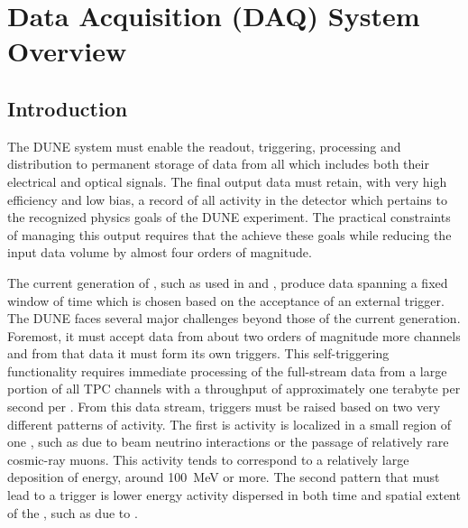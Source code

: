 \section{Data Acquisition (DAQ) System Overview}
\label{sec:fd-daq-ov}


\subsection{Introduction}
\label{sec:fd-daq-intro}

The DUNE   system must enable the readout,
triggering, processing and distribution to permanent storage of data
from all  which includes both their electrical
 and optical  signals.  
The final output data must retain, with very high efficiency and low
bias, a record of all activity in the detector which pertains to the
recognized physics goals of the DUNE experiment. 
The practical constraints of managing this output requires that the
 achieve these goals while reducing the input data volume by almost four
orders of magnitude.

The current generation of \lartpc {}, such as used in
 and \microboone, produce data spanning a fixed window of
time which is chosen based on the acceptance of an external trigger. 
The DUNE  faces several major challenges beyond those of the
current generation. 
Foremost, it must accept data from about two orders of magnitude more
channels and from that data it must form its own triggers.
This self-triggering functionality requires immediate processing of
the full-stream data from a large portion of all TPC channels with a
throughput of approximately one terabyte per second per
. 
From this data stream, triggers must be raised based on two very
different patterns of activity. 
The first is activity %
is localized in a small region of one
, such as due to beam neutrino interactions or the
passage of relatively rare cosmic-ray muons. 
This activity tends to correspond to a relatively large deposition of
energy, around \SI{100}{\MeV} or more. 
The second pattern that must lead to a trigger is lower energy activity
dispersed in both time and spatial extent of the , such as due to
.

